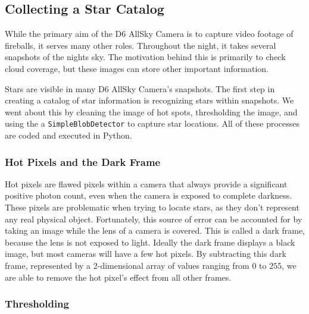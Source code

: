 \subsection{Collecting a Star Catalog}

While the primary aim of the D6 AllSky Camera is to capture video footage of fireballs, it serves many other roles. 
Throughout the night, it takes several snapshots of the nights sky. 
The motivation behind this is primarily to check cloud coverage, but these images can store other important information.

Stars are visible in many D6 AllSky Camera's snapshots.  
The first step in creating a catalog of star information is recognizing stars within snapshots.  
We went about this by cleaning the image of hot spots, thresholding the image, and using the a \texttt{SimpleBlobDetector} to capture star locations.
All of these processes are coded and executed in Python.

\subsubsection{Hot Pixels and the Dark Frame}

Hot pixels are flawed pixels within a camera that always provide a significant positive photon count, even when the camera is exposed to complete darkness.
These pixels are problematic when trying to locate stars, as they don't represent any real physical object.
Fortunately, this source of error can be accounted for by taking an image while the lens of a camera is covered.  
This is called a dark frame, because the lens is not exposed to light.
Ideally the dark frame displays a black image, but most cameras will have a few hot pixels.
By subtracting this dark frame, represented by a 2-dimensional array of values ranging from $0$ to $255$, we are able to remove the hot pixel's effect from all other frames.

\subsubsection{Thresholding}

